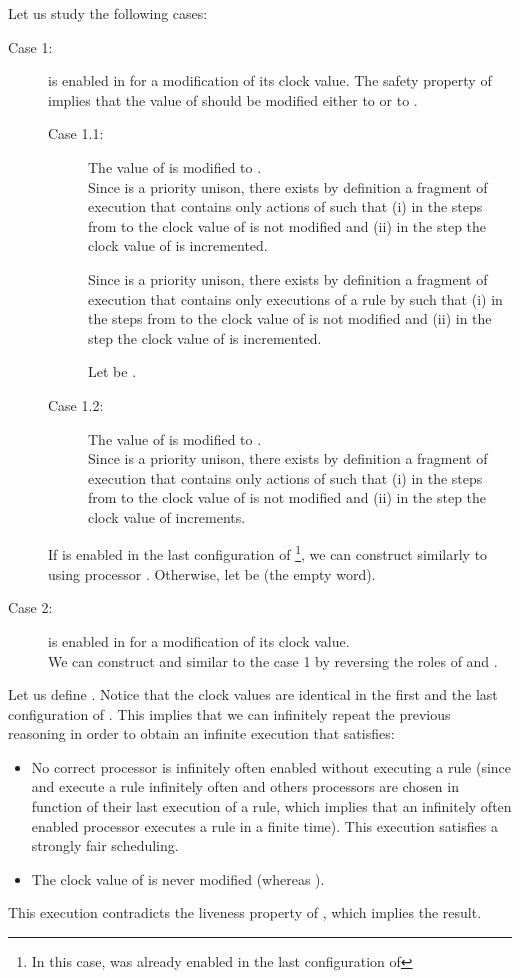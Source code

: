 \documentclass[11pt,english,letterpaper]{article}
\newenvironment{proof}{{\noindent\bf Proof. } }{{\hfill }}
\begin{document}
\begin{proof}
Let us study the following cases:

\begin{description}
\item[Case 1:]  is enabled in  for a modification of its clock value. The safety property of  implies that the value of  should be modified  either to  or to .

\begin{description}
\item[Case 1.1:] The value of  is modified to .\\
Since  is a priority unison, there exists by definition a fragment of execution  that contains only actions of  such that (i) in the steps from  to  the clock value of  is not modified and (ii) in the step	 the clock value of  is incremented.

Since  is a priority unison, there exists by definition a fragment of execution  that contains only executions of a rule by  such that (i) in the steps from  to  the clock value of  is not modified and (ii) in the step	 the clock value of  is incremented.

Let   be .

\item[Case 1.2:] The value of  is modified to .\\
Since  is a priority unison, there exists by definition a fragment of execution  that contains only actions of  such that (i) in the steps from  to  the clock value of  is not modified and (ii) in the step	 the clock value of  increments.
\end{description}

If  is enabled in the last configuration of  \footnote{In this case,  was already enabled in the last configuration of }, we can construct  similarly to  using processor . Otherwise, let  be  (the empty word).

\item[Case 2:]  is enabled in  for a modification of its clock value.\\
We can construct  and  similar to the case 1 by reversing the roles of  and .
\end{description}

Let us define . Notice that the clock values are identical in the first and the last configuration of . This implies that we can infinitely repeat the previous reasoning in order to obtain an infinite execution  that satisfies:

\begin{itemize}
\item No correct processor is infinitely often enabled without executing a rule (since  and  execute a rule infinitely often and others processors are chosen in function of their last execution of a rule, which implies that an infinitely often enabled processor executes a rule in a finite time). This execution satisfies a strongly fair scheduling.
\item The clock value of  is never modified (whereas ).
\end{itemize}

This execution contradicts the liveness property of , which implies the result.
\end{proof}
\end{document}
